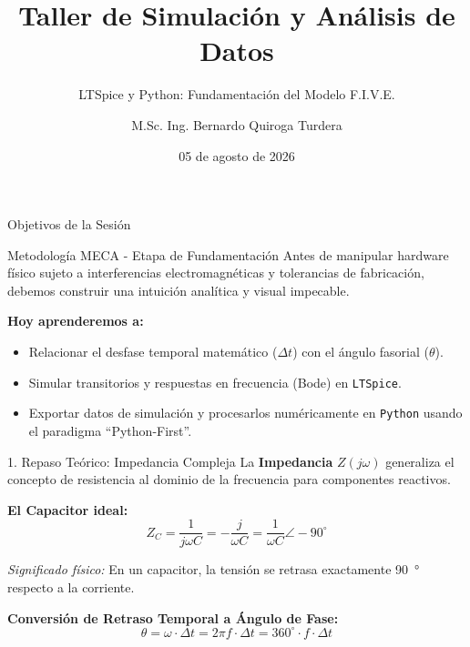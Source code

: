 \documentclass[aspectratio=169, 10pt]{beamer}
\title[IMT-221 \textbar{} Sesión 2]{Taller de Simulación y Análisis de Datos}
\subtitle{LTSpice y Python: Fundamentación del Modelo F.I.V.E.}
\author{M.Sc. Ing. Bernardo Quiroga Turdera}
\institute[UCB Tarija]{Universidad Católica Boliviana ``San Pablo'' - Sede Tarija \\ Carrera de Ingeniería Mecatrónica}
\date{05 de agosto de 2026}
\begin{document}
\begin{frame}
    \titlepage
\end{frame}

\begin{frame}{Objetivos de la Sesión}
    \begin{block}{Metodología MECA - Etapa de Fundamentación}
        Antes de manipular hardware físico sujeto a interferencias electromagnéticas y tolerancias de fabricación, debemos construir una intuición analítica y visual impecable.
    \end{block}
    
    \vspace{0.3cm}
    \textbf{Hoy aprenderemos a:}
    \begin{itemize}
        \item Relacionar el desfase temporal matemático ($\Delta t$) con el ángulo fasorial ($\theta$).
        \item Simular transitorios y respuestas en frecuencia (Bode) en \texttt{LTSpice}.
        \item Exportar datos de simulación y procesarlos numéricamente en \texttt{Python} usando el paradigma ``Python-First''.
    \end{itemize}
\end{frame}

\begin{frame}{1. Repaso Teórico: Impedancia Compleja}
    La \textbf{Impedancia} $Z(j\omega)$ generaliza el concepto de resistencia al dominio de la frecuencia para componentes reactivos.
    
    \vspace{0.3cm}
    \textbf{El Capacitor ideal:}
    $$Z_C = \frac{1}{j\omega C} = -\frac{j}{\omega C} = \frac{1}{\omega C} \angle -90^\circ$$
    
    \textit{Significado físico:} En un capacitor, la tensión se retrasa exactamente \SI{90}{\degree} respecto a la corriente.
    
    \vspace{0.3cm}
    \textbf{Conversión de Retraso Temporal a Ángulo de Fase:}
    $$\theta = \omega \cdot \Delta t = 2\pi f \cdot \Delta t = 360^\circ \cdot f \cdot \Delta t$$
\end{frame}
\end{document}
